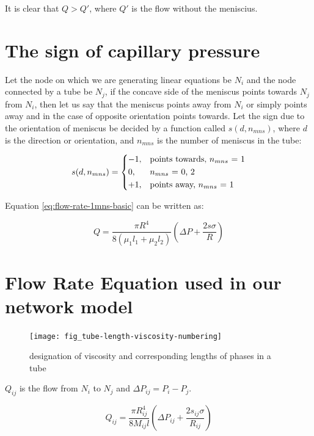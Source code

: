 	It is clear that $Q > Q'$, where $Q'$ is the flow without the meniscius.
	
	
\section{The sign of capillary pressure}

	Let the node on which we are generating linear equations be $N_i$ and the node connected by a tube be $N_j$, if the concave side of the meniscus points towards $N_j$ from $N_i$, then let us say that the meniscus points away from $N_i$ or simply points away and in the case of opposite orientation points towards. Let the sign due to the orientation of meniscus be decided by a function called $s(d, n_{mns})$, where $d$ is the direction or orientation, and $n_{mns}$ is the number of meniscus in the tube:
	
	\begin{equation}
		s(d, n_{mns}) = 
		\begin{dcases}
			-1,&\text{points towards, $n_{mns}$ = 1}\\
			0,&\text{$n_{mns}$ = 0, 2}\\
			+1,&\text{points away, $n_{mns}$ = 1}
		\end{dcases}
	\end{equation}

	Equation \ref{eq:flow-rate-1mns-basic} can be written as:
	
	\begin{equation} \label{eq:flow-rate-1mns-complex}
		Q = \frac{\pi R^4}{8({\mu}_1 l_1 + {\mu}_2 l_2)} \left( \Delta P + \frac{2s\sigma}{R} \right)
	\end{equation}


\section{Flow Rate Equation used in our network model}
	\begin{figure}[H]
		\texttt{[image: fig\_tube-length-viscosity-numbering]}
		\caption{designation of viscosity and corresponding lengths of phases in a tube}
		\label{fig_tube-length-viscosity-numbering}
	\end{figure}
	
	$Q_{ij}$ is the flow from $N_i$ to $N_j$ and $\Delta P_{ij} = P_i - P_j$.
	
	\begin{equation} \label{eq:flow-rate-main}
		\boxed{Q_{ij} = \frac{\pi R_{ij}^4}{8M_{ij}l} \left(\Delta P_{ij} + \frac{2s_{ij}\sigma}{R_{ij}} \right)}
	\end{equation}
	
